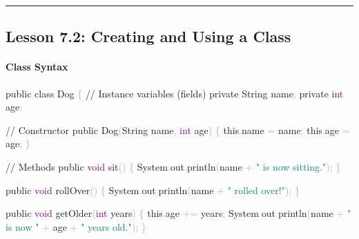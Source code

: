 \documentclass[
  justified,
  openright,
]{tufte-book}
\let\subsubsection\paragraph
\let\paragraph\paragraph
\newcommand{\BuiltInTok}[1]{#1}
\newcommand{\CommentTok}[1]{\textcolor{MidGray}{#1}}
\newcommand{\DataTypeTok}[1]{\textcolor{Purple}{#1}}
\newcommand{\FunctionTok}[1]{\textcolor{BrandBlue}{#1}}
\newcommand{\KeywordTok}[1]{\textcolor{BrandBlue}{#1}}
\newcommand{\NormalTok}[1]{#1}
\newcommand{\OperatorTok}[1]{\textcolor{DarkGray}{#1}}
\newcommand{\StringTok}[1]{\textcolor{Teal}{#1}}
\newenvironment{Shaded}{%
  \begin{snugshade}
}{%
  \end{snugshade}
}
\let\subsubsection\paragraph
\let\paragraph\paragraph
\begin{document}
\begin{center}\rule{0.5\linewidth}{0.5pt}\end{center}

\subsection{Lesson 7.2: Creating and Using a
Class}\label{lesson-7.2-creating-and-using-a-class}

\subsubsection{Class Syntax}\label{class-syntax}

\begin{Shaded}
\begin{Highlighting}[]
\KeywordTok{public} \KeywordTok{class}\NormalTok{ Dog }\OperatorTok{\{}
    \CommentTok{// Instance variables (fields)}
    \KeywordTok{private} \BuiltInTok{String}\NormalTok{ name}\OperatorTok{;}
    \KeywordTok{private} \DataTypeTok{int}\NormalTok{ age}\OperatorTok{;}

    \CommentTok{// Constructor}
    \KeywordTok{public} \FunctionTok{Dog}\OperatorTok{(}\BuiltInTok{String}\NormalTok{ name}\OperatorTok{,} \DataTypeTok{int}\NormalTok{ age}\OperatorTok{)} \OperatorTok{\{}
        \KeywordTok{this}\OperatorTok{.}\FunctionTok{name} \OperatorTok{=}\NormalTok{ name}\OperatorTok{;}
        \KeywordTok{this}\OperatorTok{.}\FunctionTok{age} \OperatorTok{=}\NormalTok{ age}\OperatorTok{;}
    \OperatorTok{\}}

    \CommentTok{// Methods}
    \KeywordTok{public} \DataTypeTok{void} \FunctionTok{sit}\OperatorTok{()} \OperatorTok{\{}
        \BuiltInTok{System}\OperatorTok{.}\FunctionTok{out}\OperatorTok{.}\FunctionTok{println}\OperatorTok{(}\NormalTok{name }\OperatorTok{+} \StringTok{" is now sitting."}\OperatorTok{);}
    \OperatorTok{\}}

    \KeywordTok{public} \DataTypeTok{void} \FunctionTok{rollOver}\OperatorTok{()} \OperatorTok{\{}
        \BuiltInTok{System}\OperatorTok{.}\FunctionTok{out}\OperatorTok{.}\FunctionTok{println}\OperatorTok{(}\NormalTok{name }\OperatorTok{+} \StringTok{" rolled over!"}\OperatorTok{);}
    \OperatorTok{\}}

    \KeywordTok{public} \DataTypeTok{void} \FunctionTok{getOlder}\OperatorTok{(}\DataTypeTok{int}\NormalTok{ years}\OperatorTok{)} \OperatorTok{\{}
        \KeywordTok{this}\OperatorTok{.}\FunctionTok{age} \OperatorTok{+=}\NormalTok{ years}\OperatorTok{;}
        \BuiltInTok{System}\OperatorTok{.}\FunctionTok{out}\OperatorTok{.}\FunctionTok{println}\OperatorTok{(}\NormalTok{name }\OperatorTok{+} \StringTok{" is now "} \OperatorTok{+}\NormalTok{ age }\OperatorTok{+} \StringTok{" years old."}\OperatorTok{);}
    \OperatorTok{\}}


\end{Highlighting}
\end{Shaded}
\end{document}
